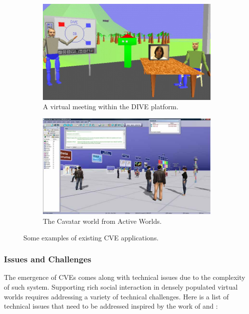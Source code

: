 \begin{figure}[htb]
  \begin{subfigure}{.5\textwidth}
    \centering
    \includegraphics[width=\linewidth]{figures/ch1/dive}
    \caption{A virtual meeting within the DIVE platform.}
    \label{fig:1_cve:dive}
  \end{subfigure}
  \begin{subfigure}{.5\textwidth}
    \centering
    \includegraphics[width=\linewidth]{figures/ch1/activeworld}
    \caption{The Cavatar world from Active Worlds.}
    \label{fig:1_cve:aw}
  \end{subfigure}
  \caption{\label{fig:1_cve} Some examples of existing CVE applications.}
\end{figure}


\subsubsection{Issues and Challenges}
\label{sec:cve-issue}
The emergence of CVEs comes along with technical issues due to the complexity of such system. Supporting rich social interaction in densely populated virtual worlds requires addressing a variety of technical challenges. Here is a list of technical issues that need to be addressed inspired by the work of \citet{Benford2001CVE} and \citet{Joslin2004CVE}:

